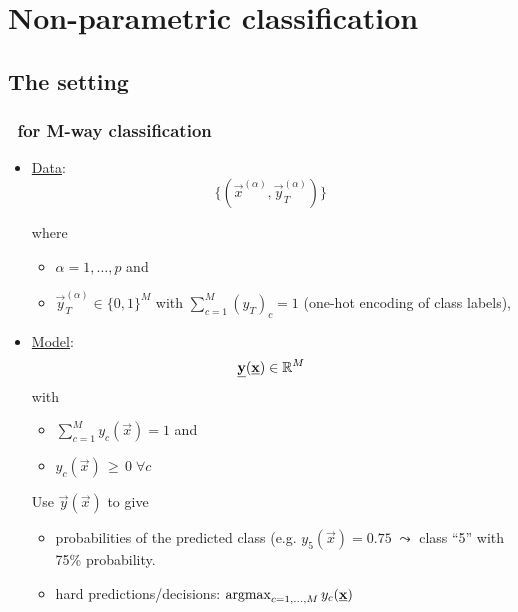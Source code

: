 
\section{Non-parametric classification}

\subsection{The setting}

\begin{frame}\frametitle{\subsecname~for M-way classification}


\begin{itemize}
	\item \underline{Data}:\\

	\begin{equation*}
	\Big\{ \left(\vec x^{(\alpha)}, \vec y^{(\alpha)}_{T} \right) \Big\}\,
	\end{equation*}

	where 
	\begin{itemize}
	\item[] $\alpha = 1,\ldots,p$ and
	\item[]$\vec y_T^{(\alpha)} \in \{0, 1\}^M$ with $\sum_{c=1}^{M} (y_{T})_c = 1$ (one-hot encoding of class labels),
	\end{itemize}

	\pause

	\item \underline{Model}:\\

	\begin{equation*}
	\underline{\mathbf{y}}(\underline{\mathbf{x}}) \in \mathbb{R}^M 
	\end{equation*}
	with 
	\begin{itemize}
	\item[] $\sum_{c=1}^{M} y_c(\vec x) = 1$ and
	\item[] $y_c(\vec x)\,\ge\,0\; \forall c$
	\end{itemize}
	
	Use $\vec y(\vec x)$ to give
	\begin{itemize}
	\item probabilities of the predicted class (e.g. $y_5(\vec x) = 0.75\; \leadsto$ class ``5'' with 75\% probability.
	\item hard predictions/decisions: $\argmax_{c=1,\ldots,M} y_c(\vec x)$
	\end{itemize}

\end{itemize}

\end{frame}


